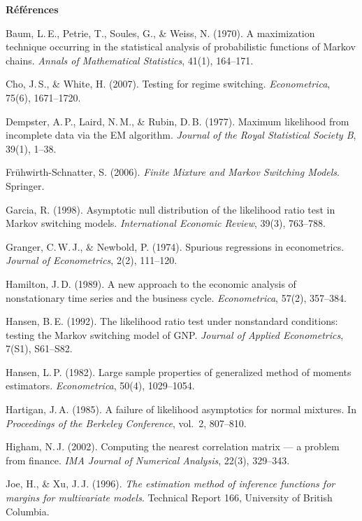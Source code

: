\documentclass[11pt,a4paper]{article}
\theoremstyle{definition}
\begin{document}
\newpage
{}
{}
{\noindent\sffamily\Large\bfseries\color{nxnavy}Références\par}
\vspace{4mm}
{\small
\begin{list}{}{\setlength{\leftmargin}{1.2em}\setlength{\itemindent}{-1.2em}\setlength{\itemsep}{2pt}}
\item Baum, L.\,E., Petrie, T., Soules, G., \& Weiss, N. (1970). A maximization technique occurring in the statistical analysis of probabilistic functions of Markov chains. \emph{Annals of Mathematical Statistics}, 41(1), 164--171.
\item Cho, J.\,S., \& White, H. (2007). Testing for regime switching. \emph{Econometrica}, 75(6), 1671--1720.
\item Dempster, A.\,P., Laird, N.\,M., \& Rubin, D.\,B. (1977). Maximum likelihood from incomplete data via the EM algorithm. \emph{Journal of the Royal Statistical Society B}, 39(1), 1--38.
\item Frühwirth-Schnatter, S. (2006). \emph{Finite Mixture and Markov Switching Models}. Springer.
\item Garcia, R. (1998). Asymptotic null distribution of the likelihood ratio test in Markov switching models. \emph{International Economic Review}, 39(3), 763--788.
\item Granger, C.\,W.\,J., \& Newbold, P. (1974). Spurious regressions in econometrics. \emph{Journal of Econometrics}, 2(2), 111--120.
\item Hamilton, J.\,D. (1989). A new approach to the economic analysis of nonstationary time series and the business cycle. \emph{Econometrica}, 57(2), 357--384.
\item Hansen, B.\,E. (1992). The likelihood ratio test under nonstandard conditions: testing the Markov switching model of GNP. \emph{Journal of Applied Econometrics}, 7(S1), S61--S82.
\item Hansen, L.\,P. (1982). Large sample properties of generalized method of moments estimators. \emph{Econometrica}, 50(4), 1029--1054.
\item Hartigan, J.\,A. (1985). A failure of likelihood asymptotics for normal mixtures. In \emph{Proceedings of the Berkeley Conference}, vol.~2, 807--810.
\item Higham, N.\,J. (2002). Computing the nearest correlation matrix --- a problem from finance. \emph{IMA Journal of Numerical Analysis}, 22(3), 329--343.
\item Joe, H., \& Xu, J.\,J. (1996). \emph{The estimation method of inference functions for margins for multivariate models}. Technical Report 166, University of British Columbia.

\end{list}}
\end{document}

